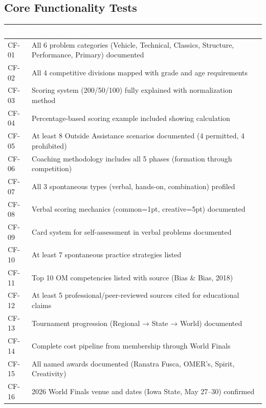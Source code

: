\documentclass[11pt,letterpaper]{article}
\newcommand{\tableheader}[1]{\textbf{\sffamily\textcolor{white}{#1}}}
\begin{document}
\subsection{Core Functionality Tests}

\begin{center}
\begin{tabularx}{\textwidth}{C{1.2cm}X}
\toprule
{}
\tableheader{ID} & \tableheader{Test Description} \\
\midrule
CF-01 & All 6 problem categories (Vehicle, Technical, Classics, Structure, Performance, Primary) documented \\
CF-02 & All 4 competitive divisions mapped with grade and age requirements \\
CF-03 & Scoring system (200/50/100) fully explained with normalization method \\
CF-04 & Percentage-based scoring example included showing calculation \\
CF-05 & At least 8 Outside Assistance scenarios documented (4 permitted, 4 prohibited) \\
CF-06 & Coaching methodology includes all 5 phases (formation through competition) \\
CF-07 & All 3 spontaneous types (verbal, hands-on, combination) profiled \\
CF-08 & Verbal scoring mechanics (common=1pt, creative=5pt) documented \\
CF-09 & Card system for self-assessment in verbal problems documented \\
CF-10 & At least 7 spontaneous practice strategies listed \\
CF-11 & Top 10 OM competencies listed with source (Bias \& Bias, 2018) \\
CF-12 & At least 5 professional/peer-reviewed sources cited for educational claims \\
CF-13 & Tournament progression (Regional → State → World) documented \\
CF-14 & Complete cost pipeline from membership through World Finals \\
CF-15 & All named awards documented (Ranatra Fusca, OMER's, Spirit, Creativity) \\
CF-16 & 2026 World Finals venue and dates (Iowa State, May 27--30) confirmed \\
\bottomrule
\end{tabularx}
\end{center}
\end{document}
